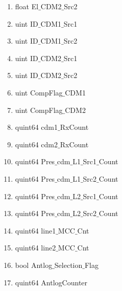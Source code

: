 \begin{enumerate}
\begin{enumerate}
	\item float El$\_$CDM2$\_$Src2
	\item uint ID$\_$CDM1$\_$Src1
	\item uint ID$\_$CDM1$\_$Src2
	\item uint ID$\_$CDM2$\_$Src1
	\item uint ID$\_$CDM2$\_$Src2
	\item uint CompFlag$\_$CDM1
	\item uint CompFlag$\_$CDM2
	\item quint64 cdm1$\_$RxCount
	\item quint64 cdm2$\_$RxCount
	\item quint64 Pres$\_$cdm$\_$L1$\_$Src1$\_$Count
	\item quint64 Pres$\_$cdm$\_$L1$\_$Src2$\_$Count
	\item quint64 Pres$\_$cdm$\_$L2$\_$Src1$\_$Count
	\item quint64 Pres$\_$cdm$\_$L2$\_$Src2$\_$Count
	\item quint64 line1$\_$MCC$\_$Cnt
	\item quint64 line2$\_$MCC$\_$Cnt
	\item bool Antlog$\_$Selection$\_$Flag
	\item quint64 AntlogCounter
\end{enumerate}


\end{enumerate}
